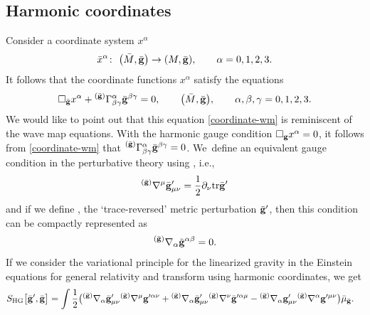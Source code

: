 \documentclass[pdftex]{sigma}
\def\ptl{\partial}%
\def\mbo#1{\boldsymbol{#1}}%
\def\grad{{\nabla}}%
\newcommand{\leftexp}[2]{{\vphantom{#2}}^{#1}{#2}}
\def\halb{\frac{1}{2}}%
\def \a{\alpha}
\def \b {\beta}
\renewcommand{\gg}{{\bf g}}
\newcommand{\bgg}{{\bar{\bf g}}}
\newcommand{\tgg}{{\tilde{\bf g}}}
\renewcommand{\a}{\alpha}
\renewcommand{\b}{\beta}
\numberwithin{equation}{section}
\begin{document}
\subsection*{Harmonic coordinates}
Consider a coordinate system $x^\a$
\begin{align*}
\bar{x}^\a \colon\ \bigl(\bar{M}, \bar{\gg}\bigr) \to (M, \bar{\gg}), \qquad \a = 0, 1, 2, 3.
\end{align*}
It follows that the coordinate functions $x^\a$ satisfy the equations
\begin{align} \label{coordinate-wm}
\square_{\bar{\gg}} x^\a + \leftexp{(\bar{\gg})}{\Gamma}_{\b \gamma}^\a \bar{\gg}^{\b \gamma} =0, \qquad \bigl(\bar{M}, \bar{\gg}\bigr), \qquad \a, \b, \gamma = 0,1, 2, 3.
\end{align}
We would like to point out that this equation \eqref{coordinate-wm} is reminiscent of the wave map equations. With the harmonic gauge condition $\square_\gg x^\a =0$, it follows from \eqref{coordinate-wm} that $ \leftexp{(\bar{\gg})}{\Gamma}_{\b \gamma}^\a \bar{\gg}^{\b \gamma} =0 $. We~define an equivalent gauge condition in the perturbative theory using \smash{$D_{\mbo{\gamma}_s} \cdot \leftexp{(\bar{\gg})}{\Gamma}_{\b \gamma}^\a \bar{\gg}^{\b \gamma}$}, i.e.,
\begin{align} \label{harmonic-gauge-condition}
\leftexp{(\bar{\gg})}{\grad}^ \mu \bgg'_{\mu \nu} = \halb \ptl_ \nu {\rm tr} \bgg'
\end{align}
and if we define \smash{$\tilde{\gg}' := \bar{\gg}'- \halb \bar{\gg}^{\a \b} \bar{\gg}'_{\a \b}$}, the `trace-reversed' metric perturbation $\bar{\gg}'$, then this condition can be compactly represented as
\begin{align*} %
\leftexp{(\bgg)}{\grad}_\a \tgg^{\a \b} =0.
\end{align*}
 If we consider the variational principle for the linearized gravity in the Einstein equations for general relativity %
and transform using harmonic coordinates, we get
\begin{align*} %
S_{{\rm HG}}\bigl[\bar{\gg}', \bar{\gg}\bigr] &{}= \int \halb \bigl(\leftexp{(\bar{\gg})}{\grad}_\a \bar{\gg}'_{\mu \nu} \leftexp{(\bar{\gg})}{\grad}^\mu \gg'^{\a \nu} + \leftexp{(\bar{\gg})}{\grad}_\a \bar{\gg}'_{\mu \nu} \leftexp{(\bar{\gg})}{\grad}^\nu \bar{\gg}'^{\a \mu}
 - \leftexp{(\bar{\gg})}{\grad}_\a \gg'_{\mu \nu} \leftexp{(\bar{\gg})}{\grad}^\a \gg'^{\mu \nu}
\bigr) \bar{\mu}_{\bar{\gg}}.
\end{align*}
\end{document}
